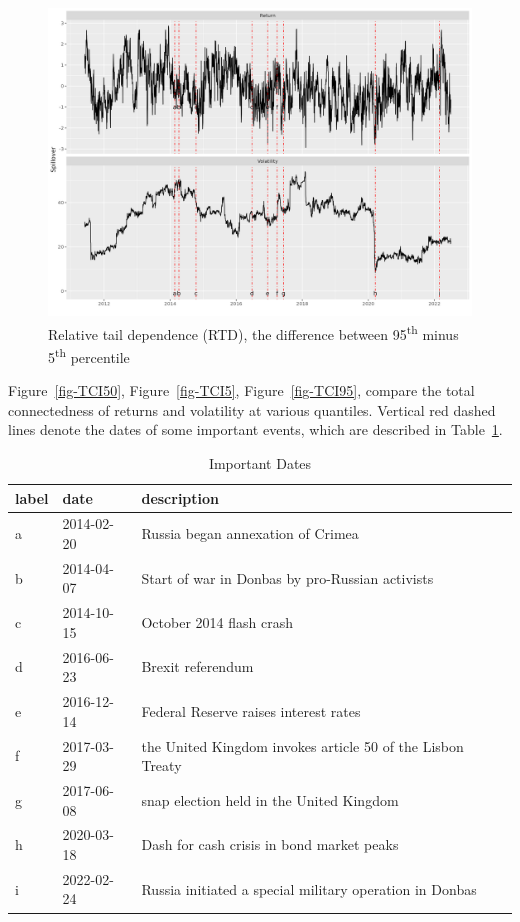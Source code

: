 \documentclass[
  letterpaper,
  DIV=11,
  numbers=noendperiod]{scrartcl}
\begin{document}
\begin{figure}[H]

{\centering \includegraphics{plots/fig-TCIrtd.png}

}

\caption{\label{fig-TCIrtd}Relative tail dependence (RTD), the
difference between 95\textsuperscript{th} minus 5\textsuperscript{th}
percentile}

\end{figure}

Figure~\ref{fig-TCI50}, Figure~\ref{fig-TCI5}, Figure~\ref{fig-TCI95},
compare the total connectedness of returns and volatility at various
quantiles. Vertical red dashed lines denote the dates of some important
events, which are described in Table~\ref{tbl-dates}.

\hypertarget{tbl-dates}{}
\begin{table}[H]
\caption{\label{tbl-dates}Important Dates }\tabularnewline

\centering
\begin{tabular}[t]{lll}
\toprule
label & date & description\\
\midrule
a & 2014-02-20 & Russia began annexation of Crimea\\
b & 2014-04-07 & Start of war in Donbas by pro-Russian activists\\
c & 2014-10-15 & October 2014 flash crash\\
d & 2016-06-23 & Brexit referendum\\
e & 2016-12-14 & Federal Reserve raises interest rates\\
\addlinespace
f & 2017-03-29 & the United Kingdom invokes article 50 of the Lisbon Treaty\\
g & 2017-06-08 & snap election held in the United Kingdom\\
h & 2020-03-18 & Dash for cash crisis in bond market peaks\\
i & 2022-02-24 & Russia initiated a special military operation in Donbas\\
\bottomrule
\end{tabular}
\end{table}
\end{document}
